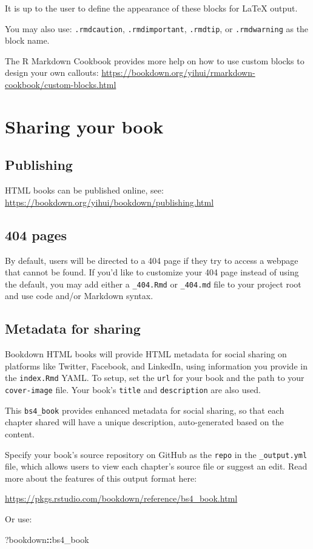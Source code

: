\documentclass[
]{book}
\newenvironment{Shaded}{\begin{snugshade}}{\end{snugshade}}
\newcommand{\NormalTok}[1]{#1}
\newcommand{\SpecialCharTok}[1]{\textcolor[rgb]{0.81,0.36,0.00}{\textbf{#1}}}
\theoremstyle{definition}
\theoremstyle{definition}
\theoremstyle{definition}
\theoremstyle{definition}
\theoremstyle{remark}
\begin{document}
It is up to the user to define the appearance of these blocks for LaTeX output.

You may also use: \texttt{.rmdcaution}, \texttt{.rmdimportant}, \texttt{.rmdtip}, or \texttt{.rmdwarning} as the block name.

The R Markdown Cookbook provides more help on how to use custom blocks to design your own callouts: \url{https://bookdown.org/yihui/rmarkdown-cookbook/custom-blocks.html}

\chapter{Sharing your book}\label{sharing-your-book}

\section{Publishing}\label{publishing}

HTML books can be published online, see: \url{https://bookdown.org/yihui/bookdown/publishing.html}

\section{404 pages}\label{pages}

By default, users will be directed to a 404 page if they try to access a webpage that cannot be found. If you'd like to customize your 404 page instead of using the default, you may add either a \texttt{\_404.Rmd} or \texttt{\_404.md} file to your project root and use code and/or Markdown syntax.

\section{Metadata for sharing}\label{metadata-for-sharing}

Bookdown HTML books will provide HTML metadata for social sharing on platforms like Twitter, Facebook, and LinkedIn, using information you provide in the \texttt{index.Rmd} YAML. To setup, set the \texttt{url} for your book and the path to your \texttt{cover-image} file. Your book's \texttt{title} and \texttt{description} are also used.

This \texttt{bs4\_book} provides enhanced metadata for social sharing, so that each chapter shared will have a unique description, auto-generated based on the content.

Specify your book's source repository on GitHub as the \texttt{repo} in the \texttt{\_output.yml} file, which allows users to view each chapter's source file or suggest an edit. Read more about the features of this output format here:

\url{https://pkgs.rstudio.com/bookdown/reference/bs4_book.html}

Or use:

\begin{Shaded}
\begin{Highlighting}[]
\NormalTok{?bookdown}\SpecialCharTok{::}\NormalTok{bs4\_book}
\end{Highlighting}
\end{Shaded}



\end{document}
